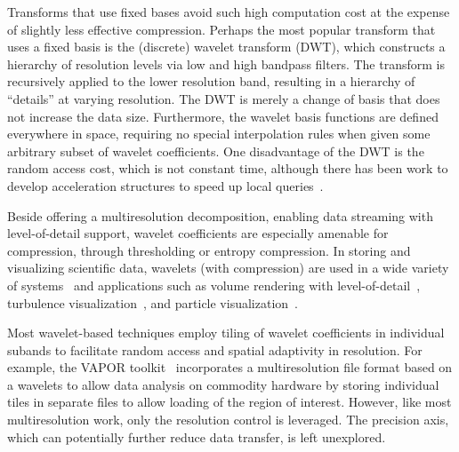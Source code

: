 Transforms that use fixed bases avoid such high computation cost at the expense of slightly less
effective compression. Perhaps the most popular transform that uses a fixed basis is the (discrete)
wavelet transform (DWT), which constructs a hierarchy of resolution levels via low and high bandpass
filters. The transform is recursively applied to the lower resolution band, resulting in a hierarchy
of ``details'' at varying resolution. The DWT is merely a change of basis that does not increase the
data size. Furthermore, the wavelet basis functions are defined everywhere in space, requiring no
special interpolation rules when given some arbitrary subset of wavelet coefficients. One
disadvantage of the DWT is the random access cost, which is not constant time, although there has
been work to develop acceleration structures to speed up local queries~\cite{weiss}.

Beside offering a multiresolution decomposition, enabling data streaming with level-of-detail
support, wavelet coefficients are especially amenable for compression, through thresholding or
entropy compression. In storing and visualizing scientific data, wavelets (with compression) are
used in a wide variety of systems~\cite{multires_toolkit2003,vapor2007,woodring2011} and
applications such as volume rendering with
level-of-detail~\cite{wavelet-compression-interactive-vis,multires-framework,rapid-compression-volume,interactive-rendering-large-volume,multires-volume-rendering},
turbulence visualization~\cite{treib}, and particle visualization~\cite{sph-octree}.

Most wavelet-based techniques employ tiling of wavelet coefficients in individual subands to
facilitate random access and spatial adaptivity in resolution. For example, the VAPOR
toolkit~\cite{vapor2007} incorporates a multiresolution file format based on a wavelets to allow
data analysis on commodity hardware by storing individual tiles in separate files to allow loading
of the region of interest. However, like most multiresolution work, only the resolution control is
leveraged. The precision axis, which can potentially further reduce data transfer, is left
unexplored.

